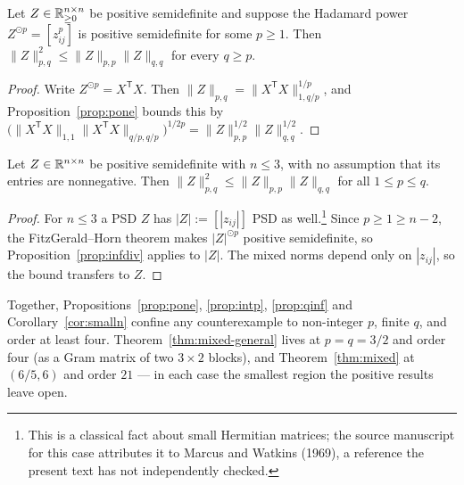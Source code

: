 \begin{proposition}\label{prop:infdiv}
Let $Z\in\mathbb R_{\ge0}^{n\times n}$ be positive semidefinite and suppose the Hadamard power $Z^{\odot p}=[z_{ij}^p]$ is positive semidefinite for some $p\ge1$.  Then $\|Z\|_{{p,q}}^2\le\|Z\|_{{p,p}}\|Z\|_{{q,q}}$ for every $q\ge p$.
\end{proposition}
\begin{proof}
Write $Z^{\odot p}=X^{\mathsf T}X$.  Then $\|Z\|_{{p,q}}=\|X^{\mathsf T}X\|_{{1,q/p}}^{1/p}$, and Proposition~\ref{prop:pone} bounds this by $\bigl(\|X^{\mathsf T}X\|_{{1,1}}\|X^{\mathsf T}X\|_{{q/p,q/p}}\bigr)^{1/2p}=\|Z\|_{{p,p}}^{1/2}\|Z\|_{{q,q}}^{1/2}$.
\end{proof}

\begin{corollary}\label{cor:smalln}
Let $Z\in\mathbb R^{n\times n}$ be positive semidefinite with $n\le3$, with no assumption that its entries are nonnegative.  Then $\|Z\|_{{p,q}}^2\le\|Z\|_{{p,p}}\|Z\|_{{q,q}}$ for all $1\le p\le q$.
\end{corollary}
\begin{proof}
For $n\le3$ a PSD $Z$ has $|Z|:=[|z_{ij}|]$ PSD as well.\footnote{This is a classical fact about small Hermitian matrices; the source manuscript for this case attributes it to Marcus and Watkins (1969), a reference the present text has not independently checked.}  Since $p\ge1\ge n-2$, the FitzGerald--Horn theorem \citep{FitzGeraldHorn1977} makes $|Z|^{\odot p}$ positive semidefinite, so Proposition~\ref{prop:infdiv} applies to $|Z|$.  The mixed norms depend only on $|z_{ij}|$, so the bound transfers to $Z$.
\end{proof}

Together, Propositions~\ref{prop:pone}, \ref{prop:intp}, \ref{prop:qinf} and Corollary~\ref{cor:smalln} confine any counterexample
to non-integer $p$, finite $q$, and order at least four.  Theorem~\ref{thm:mixed-general}
lives at $p=q=3/2$ and order four (as a Gram matrix of two $3\times2$ blocks), and
Theorem~\ref{thm:mixed} at $(6/5,6)$ and order $21$ --- in each case the smallest region the
positive results leave open.


